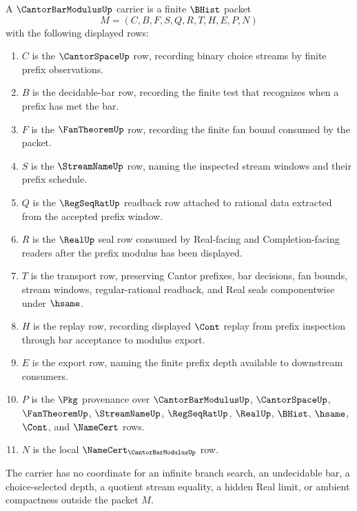 \begin{definition}
\label{def:cantor-bar-modulus-carrier}
A $\CantorBarModulusUp$ carrier is a finite $\BHist$ packet
$$
M=(C,B,F,S,Q,R,T,H,E,P,N)
$$
with the following displayed rows:
\begin{enumerate}
\item $C$ is the $\CantorSpaceUp$ row, recording binary choice streams by finite prefix observations.
\item $B$ is the decidable-bar row, recording the finite test that recognizes when a prefix has met the bar.
\item $F$ is the $\FanTheoremUp$ row, recording the finite fan bound consumed by the packet.
\item $S$ is the $\StreamNameUp$ row, naming the inspected stream windows and their prefix schedule.
\item $Q$ is the $\RegSeqRatUp$ readback row attached to rational data extracted from the accepted prefix window.
\item $R$ is the $\RealUp$ seal row consumed by Real-facing and Completion-facing readers after the prefix modulus has been displayed.
\item $T$ is the transport row, preserving Cantor prefixes, bar decisions, fan bounds, stream windows, regular-rational readback, and Real seals componentwise under $\hsame$.
\item $H$ is the replay row, recording displayed $\Cont$ replay from prefix inspection through bar acceptance to modulus export.
\item $E$ is the export row, naming the finite prefix depth available to downstream consumers.
\item $P$ is the $\Pkg$ provenance over $\CantorBarModulusUp$, $\CantorSpaceUp$, $\FanTheoremUp$, $\StreamNameUp$, $\RegSeqRatUp$, $\RealUp$, $\BHist$, $\hsame$, $\Cont$, and $\NameCert$ rows.
\item $N$ is the local $\NameCert_{\CantorBarModulusUp}$ row.
\end{enumerate}
The carrier has no coordinate for an infinite branch search, an undecidable bar, a choice-selected depth, a quotient stream equality, a hidden Real limit, or ambient compactness outside the packet $M$.
\end{definition}

